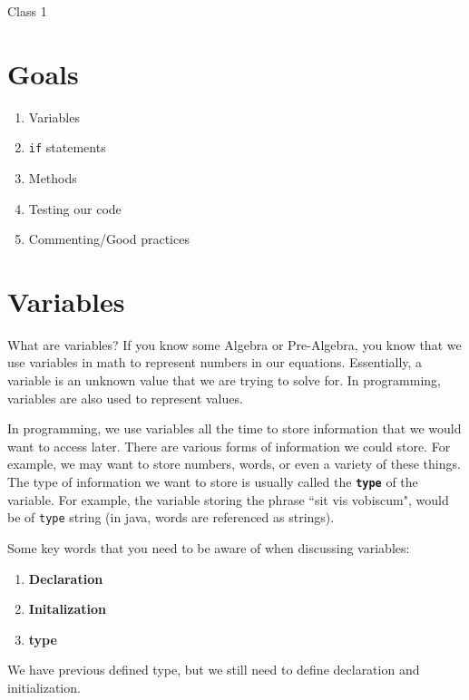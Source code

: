 \documentclass[11pt,fleqn]{article}
\begin{document}
\begin{center}
{\Huge
Class 1
}\\
\end{center}

\section*{Goals}
\begin{enumerate}[1.]
\item
Variables

\item
\texttt{if} statements

\item 
Methods

\item
Testing our code

\item
Commenting/Good practices
\end{enumerate}

\section*{Variables}
What are variables? If you know some Algebra or Pre-Algebra, you know that
we use variables in math to represent numbers in our equations. Essentially, a
variable is an unknown value that we are trying to solve for. In programming,
variables are also used to represent values. 

In programming, we use variables all the time to store information that we would
want to access later. There are various forms of information we could store. For
example, we may want to store numbers, words, or even a variety of these things.
The type of information we want to store is usually called the
\textbf{\texttt{type}} of the variable. For example, the variable storing the
phrase ``sit vis vobiscum", would be of \texttt{type} string (in java, words are
referenced as strings). 

Some key words that you need to be aware of when discussing variables:
\begin{enumerate}
\item
\textbf{Declaration}

\item
\textbf{Initalization}

\item
\textbf{type}
\end{enumerate}

We have previous defined type, but we still need to define declaration and
initialization. 
\end{document}
